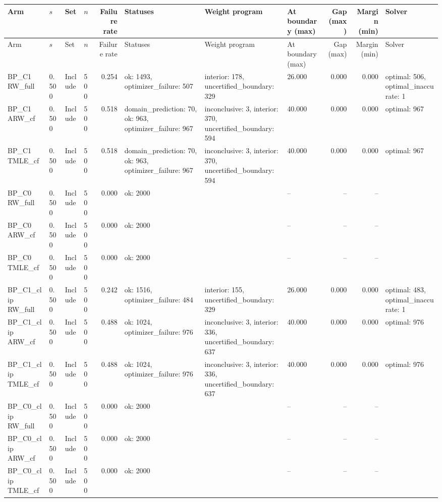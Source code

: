\begin{tabular}{llllrlllrrl}
\hline
Arm & $s$ & Set & $n$ & Failure rate & Statuses & Weight program & At boundary (max) & Gap (max) & Margin (min) & Solver \\
\hline
\endfirsthead
\hline
Arm & $s$ & Set & $n$ & Failure rate & Statuses & Weight program & At boundary (max) & Gap (max) & Margin (min) & Solver \\
\hline
\endhead
BP\_C1 RW\_full & 0.500 & Include & 500 & 0.254 & ok: 1493, optimizer\_failure: 507 & interior: 178, uncertified\_boundary: 329 & 26.000 & 0.000 & 0.000 & optimal: 506, optimal\_inaccurate: 1 \\
BP\_C1 ARW\_cf & 0.500 & Include & 500 & 0.518 & domain\_prediction: 70, ok: 963, optimizer\_failure: 967 & inconclusive: 3, interior: 370, uncertified\_boundary: 594 & 40.000 & 0.000 & 0.000 & optimal: 967 \\
BP\_C1 TMLE\_cf & 0.500 & Include & 500 & 0.518 & domain\_prediction: 70, ok: 963, optimizer\_failure: 967 & inconclusive: 3, interior: 370, uncertified\_boundary: 594 & 40.000 & 0.000 & 0.000 & optimal: 967 \\
BP\_C0 RW\_full & 0.500 & Include & 500 & 0.000 & ok: 2000 &  & -- & -- & -- &  \\
BP\_C0 ARW\_cf & 0.500 & Include & 500 & 0.000 & ok: 2000 &  & -- & -- & -- &  \\
BP\_C0 TMLE\_cf & 0.500 & Include & 500 & 0.000 & ok: 2000 &  & -- & -- & -- &  \\
BP\_C1\_clip RW\_full & 0.500 & Include & 500 & 0.242 & ok: 1516, optimizer\_failure: 484 & interior: 155, uncertified\_boundary: 329 & 26.000 & 0.000 & 0.000 & optimal: 483, optimal\_inaccurate: 1 \\
BP\_C1\_clip ARW\_cf & 0.500 & Include & 500 & 0.488 & ok: 1024, optimizer\_failure: 976 & inconclusive: 3, interior: 336, uncertified\_boundary: 637 & 40.000 & 0.000 & 0.000 & optimal: 976 \\
BP\_C1\_clip TMLE\_cf & 0.500 & Include & 500 & 0.488 & ok: 1024, optimizer\_failure: 976 & inconclusive: 3, interior: 336, uncertified\_boundary: 637 & 40.000 & 0.000 & 0.000 & optimal: 976 \\
BP\_C0\_clip RW\_full & 0.500 & Include & 500 & 0.000 & ok: 2000 &  & -- & -- & -- &  \\
BP\_C0\_clip ARW\_cf & 0.500 & Include & 500 & 0.000 & ok: 2000 &  & -- & -- & -- &  \\
BP\_C0\_clip TMLE\_cf & 0.500 & Include & 500 & 0.000 & ok: 2000 &  & -- & -- & -- &  \\

\end{tabular}
